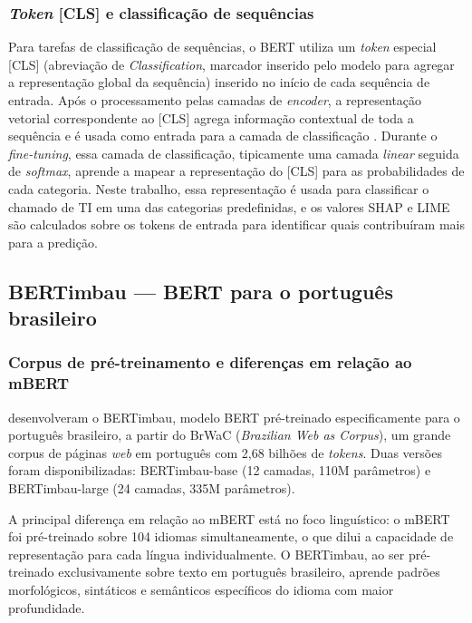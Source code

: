 \documentclass[
    12pt,                %
    openright,           %
    oneside,             %
    a4paper,             %
    english,             %
    brazil               %
]{abntex2}
\begin{document}
\subsubsection{\textit{Token} [CLS] e classificação de sequências}
\label{subsubsec:bert_cls}

Para tarefas de classificação de sequências, o BERT utiliza um \textit{token} especial [CLS] (abreviação de \textit{Classification}, marcador inserido pelo modelo para agregar a representação global da sequência) inserido no início de cada sequência de entrada. Após o processamento pelas camadas de \textit{encoder}, a representação vetorial correspondente ao [CLS] agrega informação contextual de toda a sequência e é usada como entrada para a camada de classificação \cite{devlin2019}. Durante o \textit{fine-tuning}, essa camada de classificação, tipicamente uma camada \textit{linear} seguida de \textit{softmax}, aprende a mapear a representação do [CLS] para as probabilidades de cada categoria. 
Neste trabalho, essa representação é usada para classificar o chamado de TI em uma das categorias predefinidas, e os valores SHAP e LIME são calculados sobre os tokens de entrada para identificar quais contribuíram mais para a predição.


\subsection{BERTimbau — BERT para o português brasileiro}
\label{subsec:bertimbau}

\subsubsection{Corpus de pré-treinamento e diferenças em relação ao mBERT}
\label{subsubsec:bertimbau_corpus}

 desenvolveram o BERTimbau, modelo BERT pré-treinado especificamente para o português brasileiro, a partir do BrWaC (\textit{Brazilian Web as Corpus}), um grande corpus de páginas \textit{web} em português com 2,68 bilhões de \textit{tokens}. Duas versões foram disponibilizadas: BERTimbau-base (12 camadas, 110M parâmetros) e BERTimbau-large (24 camadas, 335M parâmetros).

A principal diferença em relação ao mBERT está no foco linguístico: o mBERT foi pré-treinado sobre 104 idiomas simultaneamente, o que dilui a capacidade de representação para cada língua individualmente. O BERTimbau, ao ser pré-treinado exclusivamente sobre texto em português brasileiro, aprende padrões morfológicos, sintáticos e semânticos específicos do idioma com maior profundidade.
\end{document}
